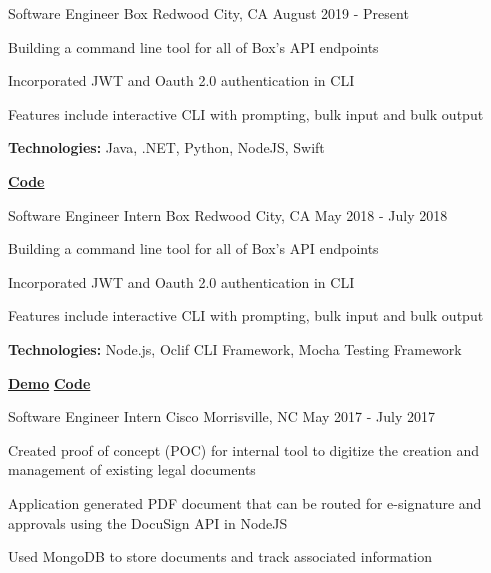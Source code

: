 
\begin{cventries}
  \cventry
    {Software Engineer} %
    {Box} %
    {Redwood City, CA} %
    {August 2019 - Present} %
    {
      \begin{cvitems} %
        \item{Building a command line tool for all of Box’s API endpoints}
        \item{Incorporated JWT and Oauth 2.0 authentication in CLI}
        \item{Features include interactive CLI with prompting, bulk input and bulk output}
        {\setlength \itemindent{-2ex} \itemsep2pt \item[] \textbf{Technologies:} Java, .NET, Python, NodeJS, Swift}
        {\setlength \itemindent{-2ex} \itemsep2pt \item[] \href{https://github.com/box/sdks}{ \faCodeFork \textbf{ Code}}}
      \end{cvitems}
    }
    
  \cventry
    {Software Engineer Intern} %
    {Box} %
    {Redwood City, CA} %
    {May 2018 - July 2018} %
    {
      \begin{cvitems} %
        \item{Building a command line tool for all of Box’s API endpoints}
        \item{Incorporated JWT and Oauth 2.0 authentication in CLI}
        \item{Features include interactive CLI with prompting, bulk input and bulk output}
        {\setlength \itemindent{-2ex} \itemsep2pt \item[] \textbf{Technologies:} Node.js, Oclif CLI Framework, Mocha Testing Framework}
        {\setlength \itemindent{-2ex} \itemsep2pt \item[]  \href{www.google.com}{ \faTelevision \textbf{ Demo}} \href{https://github.com/box/boxcli}{ \faCodeFork \textbf{ Code}}}
      \end{cvitems}
    }

  \cventry
    {Software Engineer Intern} %
    {Cisco} %
    {Morrisville, NC} %
    {May 2017 - July 2017} %
    {
      \begin{cvitems} %
        \item{Created proof of concept (POC) for internal tool to digitize the creation and management of existing legal documents}
        \item{Application generated PDF document that can be routed for e-signature and approvals using the DocuSign API in NodeJS}
        \item {Used MongoDB to store documents and track associated information}
      \end{cvitems}
    }
    

\end{cventries}
